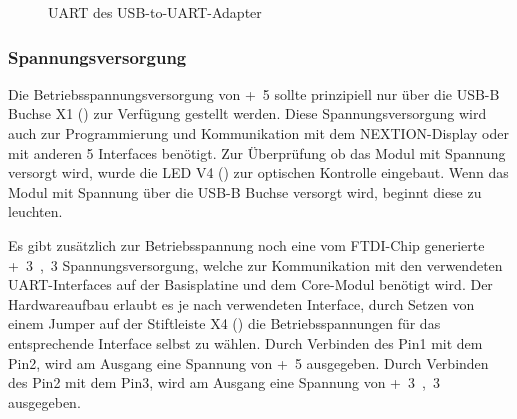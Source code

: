 \begin{figure}[H]
    \centering
    \qquad
    \qquad
    \qquad
    \caption[UART des USB-to-UART-Adapter]{UART des \gls{USB-to-UART}-Adapter}
    \label{fig:usbtouart-uart}
\end{figure}

\subsubsection{Spannungsversorgung}
Die Betriebsspannungsversorgung von \unit{+5}{\volt} sollte prinzipiell nur über die USB-B Buchse X1 () zur Verfügung gestellt werden. Diese Spannungsversorgung wird auch zur Programmierung und Kommunikation mit dem NEXTION-Display oder mit anderen \unit{5}{\volt} Interfaces benötigt. Zur Überprüfung ob das Modul mit Spannung versorgt wird, wurde die LED V4 () zur optischen Kontrolle eingebaut. Wenn das Modul mit Spannung über die USB-B Buchse versorgt wird, beginnt diese zu leuchten.

Es gibt zusätzlich zur Betriebsspannung noch eine vom FTDI-Chip generierte \unit{+3,3}{\volt} Spannungsversorgung, welche zur Kommunikation mit den verwendeten UART-Interfaces auf der \gls{Basisplatine} und dem \gls{Core-Modul} benötigt wird. Der Hardwareaufbau erlaubt es je nach verwendeten Interface, durch Setzen von einem Jumper auf der Stiftleiste X4 () die Betriebsspannungen für das entsprechende Interface selbst zu wählen. Durch Verbinden des Pin1 mit dem Pin2, wird am Ausgang eine Spannung von \unit{+5}{\volt} ausgegeben. Durch Verbinden des Pin2 mit dem Pin3, wird am Ausgang eine Spannung von \unit{+3,3}{\volt} ausgegeben.

